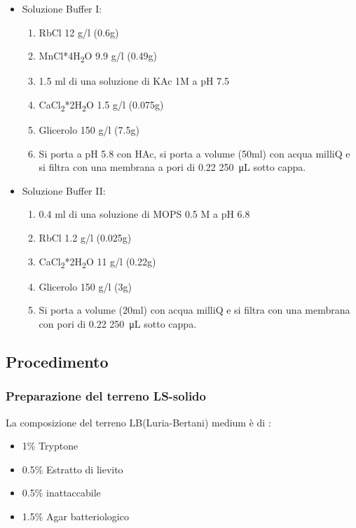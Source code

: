 \begin{itemize}

  \item Soluzione Buffer I:
  \begin{enumerate}
    \item RbCl 12 g/l (0.6g)
    \item MnCl*4H\textsubscript{2}O 9.9 g/l (0.49g)
    \item 1.5 ml di una soluzione di KAc 1M a pH 7.5
    \item CaCl\textsubscript{2}*2H\textsubscript{2}O 1.5 g/l (0.075g)
    \item Glicerolo 150 g/l (7.5g)
    \item Si porta a pH 5.8 con HAc, si porta a volume (50ml) con acqua milliQ e si filtra con una membrana a pori di 0.22 \SI{250}{\micro\liter} sotto cappa.
  \end{enumerate}
  \item Soluzione Buffer II:
  \begin{enumerate}
    \item 0.4 ml di una soluzione di MOPS 0.5 M a pH 6.8
    \item RbCl 1.2 g/l (0.025g)
    \item CaCl\textsubscript{2}*2H\textsubscript{2}O 11 g/l (0.22g)
    \item Glicerolo 150 g/l (3g)
    \item Si porta a volume (20ml) con acqua milliQ e si filtra con una membrana con pori di 0.22 \SI{250}{\micro\liter} sotto cappa.
  \end{enumerate}

\end{itemize}

\subsection{Procedimento}

\subsubsection{Preparazione del terreno LS-solido}

La composizione del terreno LB(Luria-Bertani) medium è di :

\begin{itemize}
  \item 1\% Tryptone
  \item 0.5\% Estratto di lievito
  \item 0.5\% inattaccabile
  \item 1.5\% Agar batteriologico
\end{itemize}


